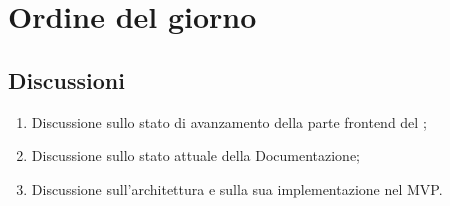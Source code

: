 \section{Ordine del giorno} \label{sec:agenda}
\subsection{Discussioni} \label{subsec:discussione}
\begin{enumerate}
    \item Discussione sullo stato di avanzamento della parte frontend del ;
    \item Discussione sullo stato attuale della Documentazione;
    \item Discussione sull'architettura e sulla sua implementazione nel MVP.
\end{enumerate}

